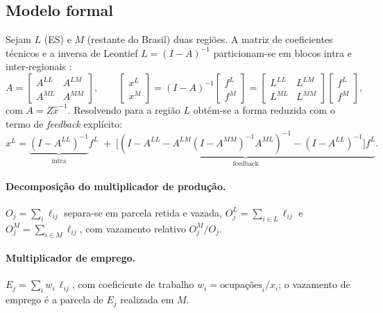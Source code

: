 \documentclass[11pt,a4paper]{article}
\begin{document}
\subsection{Modelo formal}
Sejam $L$ (ES) e $M$ (restante do Brasil) duas regiões. A matriz de
coeficientes técnicos e a inversa de Leontief $L=(I-A)^{-1}$ particionam-se em
blocos intra e inter-regionais \citep{millerblair2009,isard1951}:
\begin{equation}
A=\begin{bmatrix} A^{LL} & A^{LM}\\ A^{ML} & A^{MM}\end{bmatrix},
\qquad
\begin{bmatrix} x^{L}\\ x^{M}\end{bmatrix}
=(I-A)^{-1}\begin{bmatrix} f^{L}\\ f^{M}\end{bmatrix}
=\begin{bmatrix} L^{LL} & L^{LM}\\ L^{ML} & L^{MM}\end{bmatrix}
\begin{bmatrix} f^{L}\\ f^{M}\end{bmatrix},
\label{eq:isard}
\end{equation}
com $A=Z\hat{x}^{-1}$. Resolvendo para a região $L$ obtém-se a forma reduzida
com o termo de \emph{feedback} explícito:
\begin{equation}
x^{L}
=\underbrace{(I-A^{LL})^{-1}}_{\text{intra}}f^{L}
\;+\;\underbrace{\big[(I-A^{LL}-A^{LM}(I-A^{MM})^{-1}A^{ML})^{-1}-(I-A^{LL})^{-1}\big]f^{L}}_{\text{feedback}}.
\label{eq:feedback}
\end{equation}

\paragraph{Decomposição do multiplicador de produção.}
$O_j=\sum_i \ell_{ij}$ separa-se em parcela retida e vazada,
$O^{L}_j=\sum_{i\in L}\ell_{ij}$ e $O^{M}_j=\sum_{i\in M}\ell_{ij}$, com
vazamento relativo $O^{M}_j/O_j$.

\paragraph{Multiplicador de emprego.}
$E_j=\sum_i w_i\,\ell_{ij}$, com coeficiente de trabalho
$w_i=\text{ocupações}_i/x_i$; o vazamento de emprego é a parcela de $E_j$
realizada em $M$.
\end{document}
